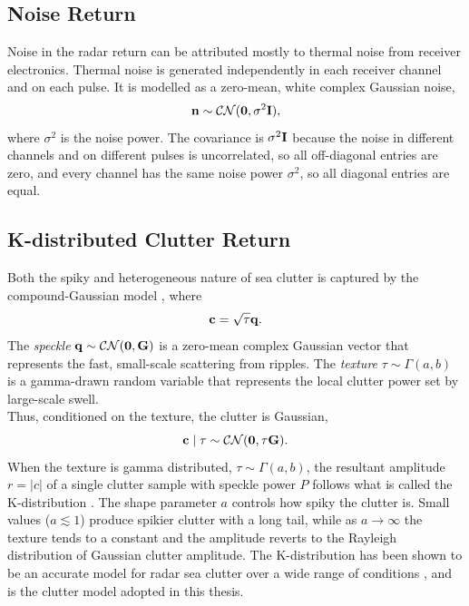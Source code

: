 \documentclass[12pt, a4paper]{report}
\begin{document}
\subsection{Noise Return}
\label{sec:noise_return}
Noise in the radar return can be attributed mostly to thermal noise from receiver electronics. Thermal noise is generated independently in each receiver channel and on each pulse. It is modelled as a zero-mean, white complex Gaussian noise,
\begin{equation}
    \vb n\sim\mathcal{CN}(\vb 0, \sigma^2\mathbf{I}),
\end{equation}
where $\sigma^2$ is the noise power. The covariance is $\sigma^2\mathbf{I}$ because the noise in different channels and on different pulses is uncorrelated, so all off-diagonal entries are zero, and every channel has the same noise power $\sigma^2$, so all diagonal entries are equal. \\

\subsection{K-distributed Clutter Return}
\label{sec:kdist_clutter}
Both the spiky and heterogeneous nature of sea clutter is captured by the compound-Gaussian model \cite{Rosenberg2017}, where
\begin{equation}
    \vb c = \sqrt{\tau}\vb q.
    \label{eq:clutter_model}
\end{equation}
The \emph{speckle} $\vb q \sim \cal CN(\vb 0, \mathbf{G})$ is a zero-mean complex Gaussian vector that represents the fast, small-scale scattering from ripples. The \emph{texture} $\tau\sim\Gamma(a, b)$ is a gamma-drawn random variable that represents the local clutter power set by large-scale swell. \\

Thus, conditioned on the texture, the clutter is Gaussian, 
\begin{equation}
    \vb c\mid\tau\sim\cal{CN}(\vb 0, \tau\mathbf{G}).
\end{equation}
When the texture is gamma distributed, $\tau\sim\Gamma(a, b)$, the resultant amplitude $r=|c|$ of a single clutter sample with speckle power $P$ follows what is called the K-distribution \cite{Gini1998}. The shape parameter $a$ controls how spiky the clutter is. Small values ($a\lesssim 1$) produce spikier clutter with a long tail, while as $a\to\infty$ the texture tends to a constant and the amplitude reverts to the Rayleigh distribution of Gaussian clutter amplitude. The K-distribution has been shown to be an accurate model for radar sea clutter over a wide range of conditions \cite{Gini2002}, and is the clutter model adopted in this thesis.\\
\end{document}
